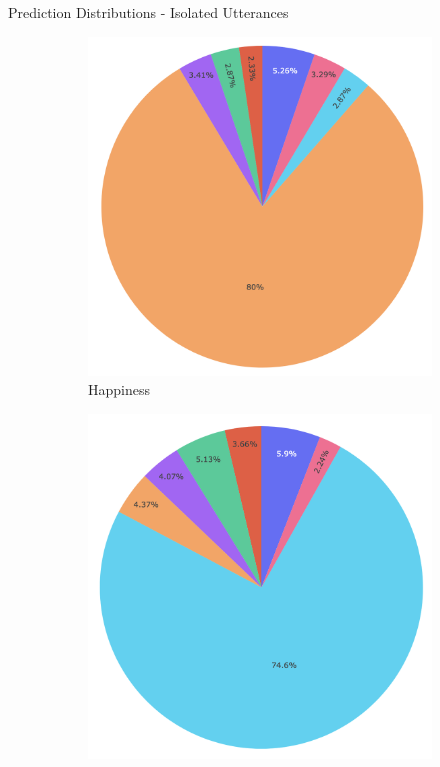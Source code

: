 \documentclass[11pt,aspectratio=169]{beamer}
\begin{document}
\begin{frame}{Prediction Distributions - Isolated Utterances}
\begin{figure}[!ht]
    \medskip
    \begin{subfigure}{0.18\textwidth}
      \includegraphics[width=\linewidth]{figures/happiness.png}
      \caption*{Happiness}
    \end{subfigure}\hfil 
    \begin{subfigure}{0.18\textwidth}
      \includegraphics[width=\linewidth]{figures/sadness.png}

\end{subfigure}
\end{figure}
\end{frame}
\end{document}
